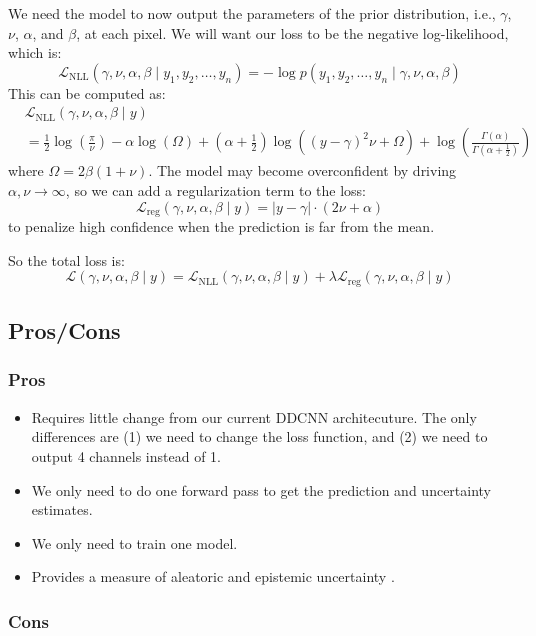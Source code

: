 \documentclass{article}
\newcommand{\f}{\frac}
\newcommand{\0}{\varnothing}
\theoremstyle{definition}
\begin{document}
We need the model to now output the parameters of the prior distribution, i.e., $\gamma$, $\nu$, $\alpha$, and $\beta$, at each pixel. We will want our loss to be the negative log-likelihood, which is:
$$\mathcal{L}_\mathrm{NLL}(\gamma, \nu, \alpha, \beta \mid y_1, y_2, \ldots, y_n) = -\log p(y_1, y_2, \ldots, y_n \mid \gamma, \nu, \alpha, \beta)$$
This can be computed as:
\begin{align*}
    &\mathcal{L}_\mathrm{NLL}(\gamma, \nu, \alpha, \beta \mid y) \\
    &= \f{1}{2}\log\left(\f{\pi}{\nu}\right) - \alpha\log(\Omega) + \left(\alpha + \f{1}{2}\right)\log((y - \gamma)^2\nu + \Omega) + \log\left(\f{\Gamma(\alpha)}{\Gamma\left(\alpha + \f{1}{2}\right)}\right)
\end{align*}
where $\Omega = 2\beta(1 + \nu)$. The model may become overconfident by driving $\alpha,\nu \to \infty$, so we can add a regularization term to the loss:
$$\mathcal{L}_\mathrm{reg}(\gamma, \nu, \alpha, \beta \mid y) = |y - \gamma| \cdot (2\nu + \alpha)$$
to penalize high confidence when the prediction is far from the mean.

So the total loss is:
$$\mathcal{L}(\gamma, \nu, \alpha, \beta \mid y) = \mathcal{L}_\mathrm{NLL}(\gamma, \nu, \alpha, \beta \mid y) + \lambda\mathcal{L}_\mathrm{reg}(\gamma, \nu, \alpha, \beta \mid y)$$

\subsection{Pros/Cons}

\subsubsection{Pros}

\begin{itemize}
  \item Requires little change from our current DDCNN architecuture. The only differences are (1) we need to change the loss function, and (2) we need to output 4 channels instead of 1.
  \item We only need to do one forward pass to get the prediction and uncertainty estimates.
  \item We only need to train one model.
  \item Provides a measure of aleatoric and epistemic uncertainty \cite{amini2020deep}.
\end{itemize}

\subsubsection{Cons}
\end{document}
